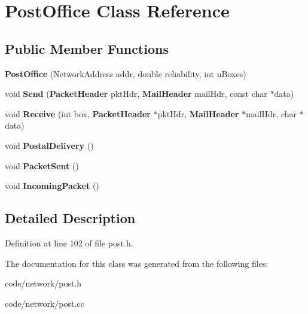 \section{Post\+Office Class Reference}
\label{class_post_office}
\subsection*{Public Member Functions}
\begin{DoxyCompactItemize}
\item 
{\bfseries Post\+Office} (Network\+Address addr, double reliability, int n\+Boxes)\label{class_post_office_af79d08378025395d9e5fbcb62fc508cb}

\item 
void {\bfseries Send} ({\bf Packet\+Header} pkt\+Hdr, {\bf Mail\+Header} mail\+Hdr, const char $\ast$data)\label{class_post_office_a06fa263f4cd816e35c8aa78c5168f21f}

\item 
void {\bfseries Receive} (int box, {\bf Packet\+Header} $\ast$pkt\+Hdr, {\bf Mail\+Header} $\ast$mail\+Hdr, char $\ast$data)\label{class_post_office_a933ada80e0a7a5f360b80a26134b5f53}

\item 
void {\bfseries Postal\+Delivery} ()\label{class_post_office_a67ca2cc25e411b1e83580728d8fcfea8}

\item 
void {\bfseries Packet\+Sent} ()\label{class_post_office_aab32fd95c48b517b274f4e20bf16e775}

\item 
void {\bfseries Incoming\+Packet} ()\label{class_post_office_a4f1c8896b71f3ef617e106baf1d08e59}

\end{DoxyCompactItemize}


\subsection{Detailed Description}


Definition at line 102 of file post.\+h.



The documentation for this class was generated from the following files\+:\begin{DoxyCompactItemize}
\item 
code/network/post.\+h\item 
code/network/post.\+cc\end{DoxyCompactItemize}
